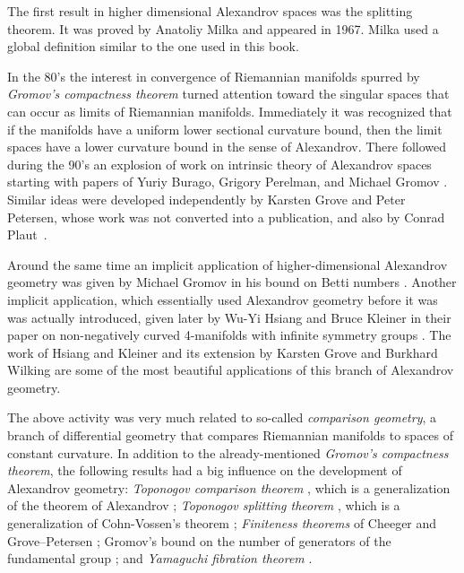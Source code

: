 The first result in higher dimensional Alexandrov spaces was the splitting theorem.
It was proved by Anatoliy Milka \cite{milka-line} and appeared in 1967.
Milka used a global definition similar to the one used in this book. %

{\sloppy 

In the 80's the interest in convergence of Riemannian manifolds spurred by \emph{Gromov's compactness theorem} \cite{gromov-MS} turned attention toward the singular spaces that can occur as limits of Riemannian manifolds.
Immediately it was recognized that if the manifolds have a uniform lower sectional curvature bound, then the limit spaces have a lower curvature bound in the sense of Alexandrov.
There followed during the 90's an explosion of work on intrinsic theory of Alexandrov spaces  starting with papers of Yuriy Burago, Grigory Perelman, and Michael Gromov  \cite{burago-gromov-perelman,perelman:spaces2}.
Similar ideas were developed independently by Karsten Grove
and Peter Petersen, whose work was not converted into a publication, and also by
Conrad Plaut~\cite{plaut-preprint}.

}

Around the same time an implicit application of higher-dimensional Alexandrov geometry was given by Michael Gromov in his bound on Betti numbers \cite{gromov:betti}.
Another implicit application, which essentially used Alexandrov geometry before it was was actually introduced, given later by Wu-Yi Hsiang and Bruce Kleiner in their paper on non-negatively curved 4-manifolds with infinite symmetry groups \cite{hsiang-kleiner}.
The work of Hsiang and Kleiner and its extension by Karsten Grove and Burkhard Wilking \cite{grove-wilking} are some of the most beautiful applications of this branch of Alexandrov geometry.

The above activity was very much related to so-called {}\emph{comparison geometry},
a branch of differential geometry that compares Riemannian manifolds  to  spaces of constant curvature.
In addition to the already-mentioned {}\emph{Gromov's compactness theorem},
the following results had a big influence on the development of Alexandrov geometry:
{}\emph{Toponogov comparison theorem} \cite{toponogov-globalization+splitting}, which is a generalization of the theorem of Alexandrov \cite{alexandrov-comparison};
{}\emph{Toponogov splitting theorem} \cite{toponogov-globalization+splitting}, which is a generalization of Cohn-Vossen's theorem \cite{cohn-vossen_line};
{}\emph{Finiteness theorems} of
Cheeger
and
Grove--Petersen \cite{cheeger-finiteness,grove-petersen:finiteness};
Gromov's bound on the number of generators of the fundamental group 
\cite[1.5]{gromov:almost-flat};
and 
{}\emph{Yamaguchi fibration theorem} \cite{yamaguchi-fibration}.

